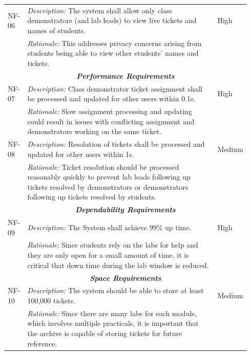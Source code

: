 \begin{table}[H]
\begin{tabular}{|p{0.07\linewidth} | p{0.78\linewidth} |p{0.09\linewidth}|}
      \hline\hline
 NF-06 & \textit{Description:} The system shall allow only class demonstrators (and lab leads) to view live tickets and names of students. & High\\
  \cline{2-2}
  & \textit{Rationale:} This addresses privacy concerns arising from students being able to view other students' names and tickets. & \\
\hline
  
    \multicolumn{3}{c}{\textit{\textbf{Performance Requirements}}}\\
    
  \hline
   NF-07 & \textit{Description:} Class demonstrator ticket assignment shall be processed and updated for other users within 0.1s. & High \\
  \cline{2-2}
  & \textit{Rationale:} Slow assignment processing and updating could result in issues with conflicting assignment and demonstrators working on the same ticket. & \\
 
   \hline\hline
   NF-08 & \textit{Description:} Resolution of tickets shall be processed and updated for other users within 1s. & Medium \\
  \cline{2-2}
  & \textit{Rationale:} Ticket resolution should be processed reasonably quickly to prevent lab leads following up tickets resolved by demonstrators or demonstrators following up tickets resolved by students. & \\
  \hline
  
      \multicolumn{3}{c}{\textit{\textbf{Dependability Requirements}}}\\
  
   \hline
   NF-09 & \textit{Description:} The System shall achieve 99\% up time. & High \\
  \cline{2-2}
  & \textit{Rationale:} Since students rely on the labs for help and they are only open for a small amount of time, it is critical that down time during the lab window is reduced. & \\
\hline
   
\multicolumn{3}{c}{\textit{\textbf{Space Requirements}}}\\
   
   \hline
   NF-10 & \textit{Description:} The system should be able to store at least 100,000 tickets. & Medium \\
    \cline{2-2}
  & \textit{Rationale:} Since there are many labs for each module, which involves multiple practicals, it is important that the archive is capable of storing tickets for future reference. & \\
 \hline

\end{tabular}
\end{table}

